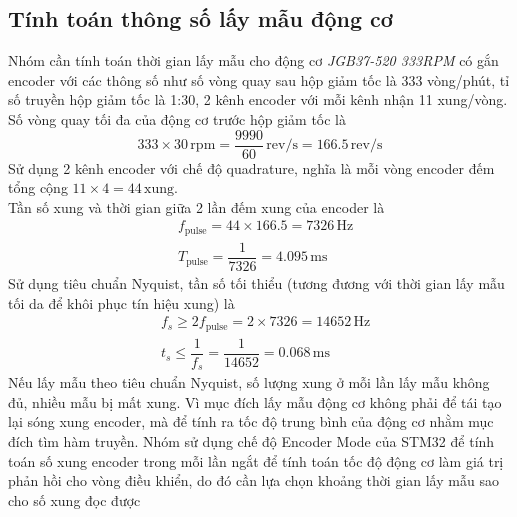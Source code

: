           \subsection{Tính toán thông số lấy mẫu động cơ}
               \hspace*{0.6cm}Nhóm cần tính toán thời gian lấy mẫu cho động cơ \textit{JGB37-520 333RPM} có gắn encoder với các thông số như số vòng quay sau 
               hộp giảm tốc là 333 vòng/phút, tỉ số truyền hộp giảm tốc là 1:30, 2 kênh encoder với mỗi kênh nhận 11 xung/vòng.\\
               Số vòng quay tối đa của động cơ trước hộp giảm tốc là
               \begin{equation*}
                    333 \times 30 \,\mathrm{rpm} = \dfrac{9990}{60} \,\mathrm{rev/s} = 166.5 \,\mathrm{rev/s}
               \end{equation*}
               \hspace*{0.6cm}Sử dụng 2 kênh encoder với chế độ quadrature, nghĩa là mỗi vòng encoder đếm tổng cộng $11 \times 4 = 44 \,\mathrm{xung}$.\\
               Tần số xung và thời gian giữa 2 lần đếm xung của encoder là 
               \begin{align*}
                    &f_{\text{pulse}} = 44 \times 166.5 = 7326 \,\mathrm{Hz}\\
                    &T_{\text{pulse}} = \dfrac{1}{7326} = 4.095 \,\mathrm{ms}
               \end{align*}
               \hspace*{0.6cm}Sử dụng tiêu chuẩn Nyquist, tần số tối thiểu (tương đương với thời gian lấy mẫu tối da để khôi phục tín hiệu xung) là 
               \begin{align*}
                    &f_s \geq 2 f_{\text{pulse}} = 2 \times 7326 = 14652 \,\mathrm{Hz}\\
                    &t_s \leq \dfrac{1}{f_s} = \dfrac{1}{14652} = 0.068 \,\mathrm{ms}
               \end{align*}
               \hspace*{0.6cm}Nếu lấy mẫu theo tiêu chuẩn Nyquist, số lượng xung ở mỗi lần lấy mẫu không đủ, nhiều mẫu bị mất xung. Vì mục đích lấy mẫu động cơ không phải để tái tạo lại sóng xung encoder, mà để tính ra tốc độ trung bình của động cơ nhằm mục đích tìm hàm truyền. Nhóm sử dụng chế độ Encoder Mode của STM32 để tính toán
               số xung encoder trong mỗi lần ngắt để tính toán tốc độ động cơ làm giá trị phản hồi cho vòng điều khiển, do đó cần lựa chọn khoảng thời gian lấy mẫu sao cho số xung đọc được 
